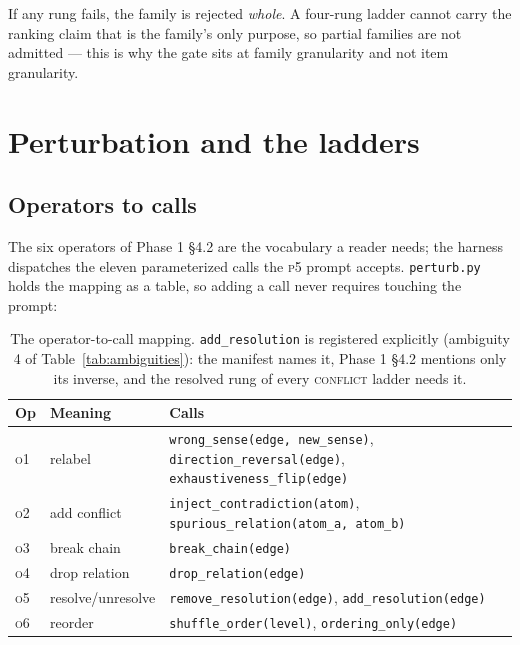 \documentclass[11pt]{article}
\newcommand{\pymod}[1]{\texttt{#1}}
\begin{document}
\noindent If any rung fails, the family is rejected \emph{whole}. A four-rung ladder cannot carry
the ranking claim that is the family's only purpose, so partial families are not admitted --- this
is why the gate sits at family granularity and not item granularity.

\section{Perturbation and the ladders}
\label{sec:ladders}

\subsection{Operators to calls}

The six operators of Phase 1 §4.2 are the vocabulary a reader needs; the harness dispatches the
eleven parameterized calls the \textsc{p5} prompt accepts. \pymod{perturb.py} holds the
mapping as a table, so adding a call never requires touching the prompt:

\begin{table}[h]\centering\small
\renewcommand{\arraystretch}{1.15}
\begin{tabular}{@{}llp{7.3cm}@{}}
\toprule
\textbf{Op} & \textbf{Meaning} & \textbf{Calls}\\
\midrule
\textsc{o1} & relabel        & \texttt{wrong\_sense(edge, new\_sense)},
  \texttt{direction\_reversal(edge)}, \texttt{exhaustiveness\_flip(edge)}\\
\textsc{o2} & add conflict   & \texttt{inject\_contradiction(atom)},
  \texttt{spurious\_relation(atom\_a, atom\_b)}\\
\textsc{o3} & break chain    & \texttt{break\_chain(edge)}\\
\textsc{o4} & drop relation  & \texttt{drop\_relation(edge)}\\
\textsc{o5} & resolve/unresolve & \texttt{remove\_resolution(edge)},
  \texttt{add\_resolution(edge)}\\
\textsc{o6} & reorder        & \texttt{shuffle\_order(level)}, \texttt{ordering\_only(edge)}\\
\bottomrule
\end{tabular}
\caption{The operator-to-call mapping. \texttt{add\_resolution} is registered explicitly
(ambiguity 4 of Table~\ref{tab:ambiguities}): the manifest names it, Phase 1 §4.2 mentions only
its inverse, and the resolved rung of every \textsc{conflict} ladder needs it.}
\label{tab:opcalls}
\end{table}
\end{document}

